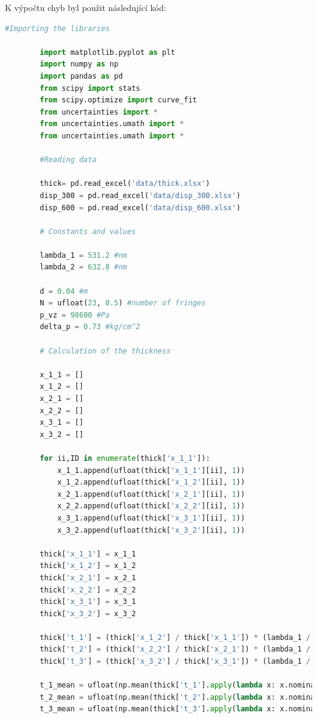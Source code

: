 \documentclass[a4paper,11pt]{article}
\begin{document}
\newpage
    \par K výpočtu chyb byl použit následující kód: 
    \begin{lstlisting}[language=Python, basicstyle=\tiny, breaklines=true, postbreak=\mbox{\textbackslashspace}]
        #Importing the libraries

        import matplotlib.pyplot as plt
        import numpy as np
        import pandas as pd
        from scipy import stats
        from scipy.optimize import curve_fit
        from uncertainties import *
        from uncertainties.umath import *
        from uncertainties.umath import *

        #Reading data

        thick= pd.read_excel('data/thick.xlsx')
        disp_300 = pd.read_excel('data/disp_300.xlsx')
        disp_600 = pd.read_excel('data/disp_600.xlsx')

        # Constants and values

        lambda_1 = 531.2 #nm
        lambda_2 = 632.8 #nm

        d = 0.04 #m 
        N = ufloat(23, 0.5) #number of fringes
        p_vz = 98600 #Pa
        delta_p = 0.73 #kg/cm^2

        # Calculation of the thickness

        x_1_1 = []
        x_1_2 = []
        x_2_1 = []
        x_2_2 = []
        x_3_1 = []
        x_3_2 = []

        for ii,ID in enumerate(thick['x_1_1']):
            x_1_1.append(ufloat(thick['x_1_1'][ii], 1))
            x_1_2.append(ufloat(thick['x_1_2'][ii], 1))
            x_2_1.append(ufloat(thick['x_2_1'][ii], 1))
            x_2_2.append(ufloat(thick['x_2_2'][ii], 1))
            x_3_1.append(ufloat(thick['x_3_1'][ii], 1))
            x_3_2.append(ufloat(thick['x_3_2'][ii], 1))

        thick['x_1_1'] = x_1_1
        thick['x_1_2'] = x_1_2
        thick['x_2_1'] = x_2_1
        thick['x_2_2'] = x_2_2
        thick['x_3_1'] = x_3_1
        thick['x_3_2'] = x_3_2

        thick['t_1'] = (thick['x_1_2'] / thick['x_1_1']) * (lambda_1 / 2)
        thick['t_2'] = (thick['x_2_2'] / thick['x_2_1']) * (lambda_1 / 2)
        thick['t_3'] = (thick['x_3_2'] / thick['x_3_1']) * (lambda_1 / 2)

        t_1_mean = ufloat(np.mean(thick['t_1'].apply(lambda x: x.nominal_value)), np.sqrt(np.std(thick['t_1'].apply(lambda x: x.nominal_value))**2 + np.mean(thick['t_1'].apply(lambda x: x.std_dev)**2)))
        t_2_mean = ufloat(np.mean(thick['t_2'].apply(lambda x: x.nominal_value)), np.sqrt(np.std(thick['t_2'].apply(lambda x: x.nominal_value))**2 + np.mean(thick['t_2'].apply(lambda x: x.std_dev)**2)))
        t_3_mean = ufloat(np.mean(thick['t_3'].apply(lambda x: x.nominal_value)), np.sqrt(np.std(thick['t_3'].apply(lambda x: x.nominal_value))**2 + np.mean(thick['t_3'].apply(lambda x: x.std_dev)**2)))


\end{lstlisting}
\end{document}
